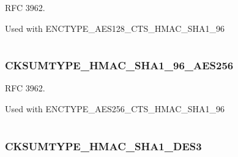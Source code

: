 \documentclass[letterpaper,10pt,english]{sphinxmanual}
\begin{document}
RFC 3962.

Used with ENCTYPE\_AES128\_CTS\_HMAC\_SHA1\_96

\begin{tabulary}{\linewidth}{|L|L|}
\hline

 & 
\\\hline
\end{tabulary}



\subsubsection{CKSUMTYPE\_HMAC\_SHA1\_96\_AES256}
\label{appdev/refs/macros/CKSUMTYPE_HMAC_SHA1_96_AES256::doc}\label{appdev/refs/macros/CKSUMTYPE_HMAC_SHA1_96_AES256:cksumtype-hmac-sha1-96-aes256}\label{appdev/refs/macros/CKSUMTYPE_HMAC_SHA1_96_AES256:cksumtype-hmac-sha1-96-aes256-data}

\begin{fulllineitems}
\label{appdev/refs/macros/CKSUMTYPE_HMAC_SHA1_96_AES256:CKSUMTYPE_HMAC_SHA1_96_AES256}
\end{fulllineitems}


RFC 3962.

Used with ENCTYPE\_AES256\_CTS\_HMAC\_SHA1\_96

\begin{tabulary}{\linewidth}{|L|L|}
\hline

 & 
\\\hline
\end{tabulary}



\subsubsection{CKSUMTYPE\_HMAC\_SHA1\_DES3}
\label{appdev/refs/macros/CKSUMTYPE_HMAC_SHA1_DES3::doc}\label{appdev/refs/macros/CKSUMTYPE_HMAC_SHA1_DES3:cksumtype-hmac-sha1-des3}\label{appdev/refs/macros/CKSUMTYPE_HMAC_SHA1_DES3:cksumtype-hmac-sha1-des3-data}

\begin{fulllineitems}
\label{appdev/refs/macros/CKSUMTYPE_HMAC_SHA1_DES3:CKSUMTYPE_HMAC_SHA1_DES3}
\end{fulllineitems}
\end{document}
